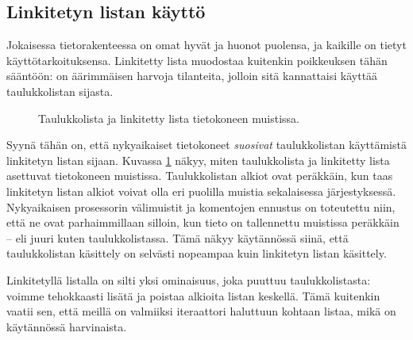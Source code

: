 \subsection{Linkitetyn listan käyttö}

Jokaisessa tietorakenteessa on omat hyvät ja huonot puolensa,
ja kaikille on tietyt käyttötarkoituksensa.
Linkitetty lista muodostaa kuitenkin poikkeuksen tähän sääntöön:
on äärimmäisen harvoja tilanteita, jolloin sitä kannattaisi
käyttää taulukkolistan sijasta.

\begin{figure}
\center
{}
\caption{Taulukkolista ja linkitetty lista tietokoneen muistissa.}
\label{fig:taulin}
\end{figure}

Syynä tähän on, että nykyaikaiset tietokoneet
\emph{suosivat} taulukkolistan käyttämistä linkitetyn listan sijaan.
Kuvassa \ref{fig:taulin} näkyy, miten taulukkolista ja linkitetty lista
asettuvat tietokoneen muistissa.
Taulukkolistan alkiot ovat peräkkäin, kun taas linkitetyn
listan alkiot voivat olla eri puolilla muistia sekalaisessa
järjestyksessä.
Nykyaikaisen prosessorin välimuistit ja komentojen ennustus
on toteutettu niin, että ne ovat parhaimmillaan silloin,
kun tieto on tallennettu muistissa peräkkäin -- eli juuri kuten
taulukkolistassa.
Tämä näkyy käytännössä siinä, että taulukkolistan käsittely on selvästi
nopeampaa kuin linkitetyn listan käsittely.

Linkitetyllä listalla on silti yksi ominaisuus,
joka puuttuu taulukkolistasta: voimme tehokkaasti
lisätä ja poistaa alkioita listan keskellä.
Tämä kuitenkin vaatii sen, että meillä on valmiiksi
iteraattori haluttuun kohtaan listaa,
mikä on käytännössä harvinaista.